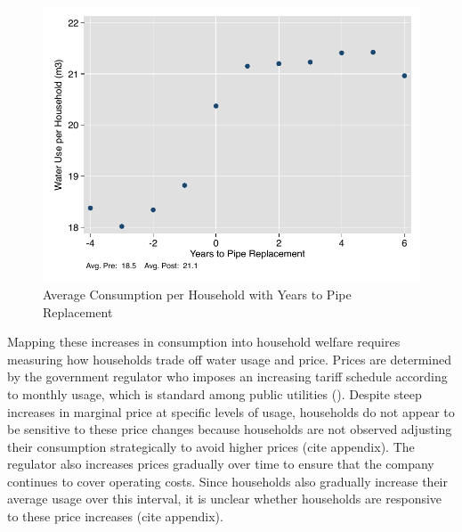 \documentclass[12pt,table]{article}
\begin{document}
\begin{figure}
\begin{center}
\caption{Average Consumption per Household with Years to Pipe Replacement}\label{figure:pipecons}
\includegraphics[scale=1]{tables/pipe_cons.pdf}
\end{center}
\end{figure}

Mapping these increases in consumption into household welfare requires measuring how households trade off water usage and price.  Prices are determined by the government regulator who imposes an increasing tariff schedule according to monthly usage, which is standard among public utilities (\cite{hoque2013state}).  Despite steep increases in marginal price at specific levels of usage, households do not appear to be sensitive to these price changes because households are not observed adjusting their consumption strategically to avoid higher prices (cite appendix).  The regulator also increases prices gradually over time to ensure that the company continues to cover operating costs.  Since households also gradually increase their average usage over this interval, it is unclear whether households are responsive to these price increases (cite appendix).
\end{document}
